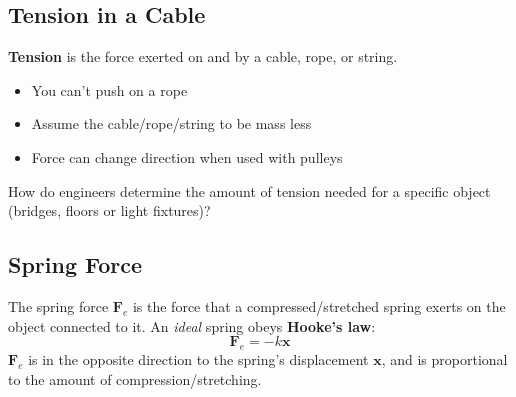 



\subsection{Tension in a Cable}
\textbf{Tension} is the force exerted on and by a cable, rope, or string.
\begin{itemize}
\item You can't push on a rope
\item Assume the cable/rope/string to be mass less
\item Force can change direction when used with pulleys
\end{itemize}
How do engineers determine the amount of tension needed for a specific object
(bridges, floors or light fixtures)?




\subsection{Spring Force}
The spring force $\bm F_e$ is the force that a compressed/stretched spring
exerts on the object connected to it. An \emph{ideal} spring obeys
\textbf{Hooke's law}:
\begin{equation}
  \boxed{
    \bm F_e=-k\bm x
  }
\end{equation}
$\bm F_e$ is in the opposite direction to the spring's displacement $\bm x$,
and is proportional to the amount of compression/stretching.

